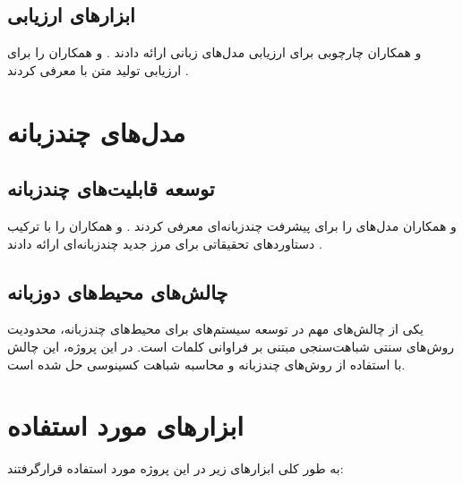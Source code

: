 \documentclass[11pt, a4paper, oneside]{book}
\begin{document}
	\subsection{ابزارهای ارزیابی}
	
	 و همکاران چارچوبی برای ارزیابی  مدل‌های زبانی ارائه دادند \cite{eval-harness}.  و همکاران  را برای ارزیابی تولید متن با  معرفی کردند \cite{zhang_bertscore_2020}.
	
	\section{مدل‌های چندزبانه}
	
	\subsection{توسعه قابلیت‌های چندزبانه}
	
	 و همکاران مدل‌های  را برای پیشرفت چندزبانه‌ای معرفی کردند \cite{aryabumi_aya_2024}.  و همکاران  را با ترکیب دستاوردهای تحقیقاتی برای مرز جدید چندزبانه‌ای ارائه دادند \cite{dang_aya_2024}.
	
	\subsection{چالش‌های محیط‌های دوزبانه}
	
	یکی از چالش‌های مهم در توسعه سیستم‌های  برای محیط‌های چندزبانه، محدودیت روش‌های سنتی شباهت‌سنجی مبتنی بر فراوانی کلمات است. در این پروژه، این چالش با استفاده از روش‌های  چندزبانه و محاسبه شباهت کسینوسی حل شده است.
	
	\section{ابزار‌های مورد استفاده}
	
	به طور کلی ابزار‌های زیر در این پروژه مورد استفاده قرار‌گرفتند:
	
\end{document}
